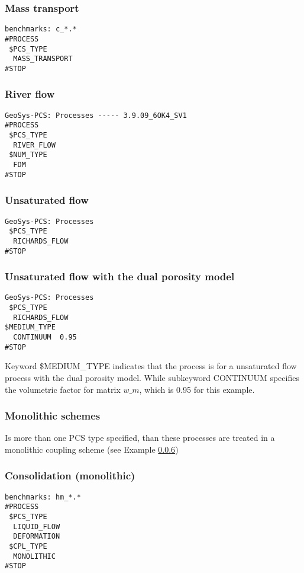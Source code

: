 {\subsubsection{Mass transport}
\begin{verbatim}
benchmarks: c_*.*
#PROCESS
 $PCS_TYPE
  MASS_TRANSPORT
#STOP
\end{verbatim}
\subsubsection{River flow}
\begin{verbatim}
GeoSys-PCS: Processes ----- 3.9.09_6OK4_SV1
#PROCESS
 $PCS_TYPE
  RIVER_FLOW
 $NUM_TYPE
  FDM
#STOP
\end{verbatim}

\subsubsection{Unsaturated flow}
\begin{verbatim}
GeoSys-PCS: Processes
 $PCS_TYPE
  RICHARDS_FLOW
#STOP
\end{verbatim}

\subsubsection{Unsaturated flow with the dual porosity model} %
\begin{verbatim}
GeoSys-PCS: Processes
 $PCS_TYPE
  RICHARDS_FLOW
$MEDIUM_TYPE
  CONTINUUM  0.95
#STOP
\end{verbatim}
Keyword \mbox{\$MEDIUM\_TYPE} indicates that the process is for a unsaturated flow process with the dual porosity model.
While subkeyword \mbox{CONTINUUM} specifies the volumetric factor for matrix $w\_m$, which is 0.95 for this example.

\subsubsection{Monolithic schemes}
Is more than one PCS type specified, than these processes are treated in a monolithic coupling scheme
(see Example \ref{sec:ex_monolithic})
\subsubsection{Consolidation (monolithic)}
\label{sec:ex_monolithic}
\begin{verbatim}
benchmarks: hm_*.*
#PROCESS
 $PCS_TYPE
  LIQUID_FLOW
  DEFORMATION
 $CPL_TYPE
  MONOLITHIC
#STOP
\end{verbatim}

} %


\newpage
